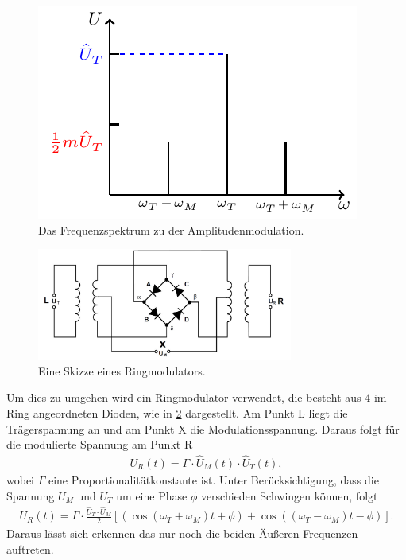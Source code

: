 \begin{figure}
	\centering
	\includegraphics[width =\textwidth/2]{../Grafiken/tikz/tikz-Frequenzspektrum.pdf}
	\caption{Das Frequenzspektrum zu der Amplitudenmodulation.\label{fig:Frequenzspektrum} }
\end{figure}
\newpage
\begin{figure}
	\centering
	\includegraphics[width = 0.75\textwidth]{../Grafiken/Ringmodulator.pdf}
	\caption{Eine Skizze eines Ringmodulators.\cite{V59}\label{fig:Ringmodulator}}
\end{figure}
Um dies zu umgehen wird ein Ringmodulator verwendet, die besteht aus 4 im Ring angeordneten Dioden, wie in \cref{fig:Ringmodulator} dargestellt.
Am Punkt L liegt die Trägerspannung an und am Punkt X die Modulationsspannung.
Daraus folgt für die modulierte Spannung am Punkt R
\begin{align}
	U_R(t)=\Gamma\cdot \hat U_M(t) \cdot\hat U_T(t),
\end{align}
wobei $\Gamma$ eine Proportionalitätkonstante ist. Unter Berücksichtigung, dass die Spannung $U_M$ und $U_T$ um eine Phase $\phi$ verschieden Schwingen können, folgt
\begin{align}
	U_R(t)=\Gamma\cdot \frac{\hat U_T\cdot\hat U_M}{2}\left[ \left(\cos\left(\omega_T+\omega_M\right)t+\phi\right) +\cos\left(\left(\omega_T-\omega_M\right)t-\phi\right) \right].
	\label{eq:amplituden_moduliert_ohne_traeger}
\end{align}
Daraus lässt sich erkennen das nur noch die beiden Äußeren Frequenzen auftreten.

